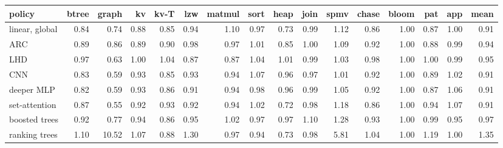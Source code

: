 \begin{tabular}{lrrrrrrrrrrrrrrr}
\toprule
policy & btree & graph & kv & kv-T & lzw & matmul & sort & heap & join & spmv & chase & bloom & pat & app & mean \\
\midrule
linear, global & 0.84 & 0.74 & 0.88 & 0.85 & 0.94 & 1.10 & 0.97 & 0.73 & 0.99 & 1.12 & 0.86 & 1.00 & 0.87 & 1.00 & 0.91 \\
ARC & 0.89 & 0.86 & 0.89 & 0.90 & 0.98 & 0.97 & 1.01 & 0.85 & 1.00 & 1.09 & 0.92 & 1.00 & 0.88 & 0.99 & 0.94 \\
LHD & 0.97 & 0.63 & 1.00 & 1.04 & 0.87 & 0.87 & 1.04 & 1.01 & 0.99 & 1.03 & 0.98 & 1.00 & 1.00 & 0.99 & 0.95 \\
CNN & 0.83 & 0.59 & 0.93 & 0.85 & 0.93 & 0.94 & 1.07 & 0.96 & 0.97 & 1.01 & 0.92 & 1.00 & 0.89 & 1.02 & 0.91 \\
deeper MLP & 0.82 & 0.59 & 0.93 & 0.86 & 0.91 & 0.94 & 0.98 & 0.96 & 0.99 & 1.05 & 0.92 & 1.00 & 0.87 & 1.06 & 0.91 \\
set-attention & 0.87 & 0.55 & 0.92 & 0.93 & 0.92 & 0.94 & 1.02 & 0.72 & 0.98 & 1.18 & 0.86 & 1.00 & 0.94 & 1.07 & 0.91 \\
boosted trees & 0.92 & 0.77 & 0.94 & 0.86 & 0.95 & 1.02 & 0.97 & 0.97 & 1.10 & 1.28 & 0.93 & 1.00 & 0.99 & 0.95 & 0.97 \\
ranking trees & 1.10 & 10.52 & 1.07 & 0.88 & 1.30 & 0.97 & 0.94 & 0.73 & 0.98 & 5.81 & 1.04 & 1.00 & 1.19 & 1.00 & 1.35 \\
\bottomrule
\end{tabular}
